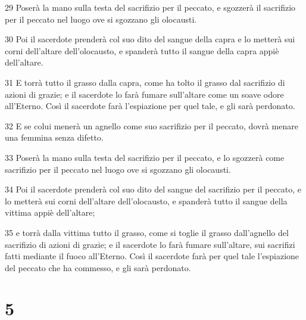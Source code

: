 \par 29 Poserà la mano sulla testa del sacrifizio per il peccato, e sgozzerà il sacrifizio per il peccato nel luogo ove si sgozzano gli olocausti.
\par 30 Poi il sacerdote prenderà col suo dito del sangue della capra e lo metterà sui corni dell'altare dell'olocausto, e spanderà tutto il sangue della capra appiè dell'altare.
\par 31 E torrà tutto il grasso dalla capra, come ha tolto il grasso dal sacrifizio di azioni di grazie; e il sacerdote lo farà fumare sull'altare come un soave odore all'Eterno. Così il sacerdote farà l'espiazione per quel tale, e gli sarà perdonato.
\par 32 E se colui menerà un agnello come suo sacrifizio per il peccato, dovrà menare una femmina senza difetto.
\par 33 Poserà la mano sulla testa del sacrifizio per il peccato, e lo sgozzerà come sacrifizio per il peccato nel luogo ove si sgozzano gli olocausti.
\par 34 Poi il sacerdote prenderà col suo dito del sangue del sacrifizio per il peccato, e lo metterà sui corni dell'altare dell'olocausto, e spanderà tutto il sangue della vittima appiè dell'altare;
\par 35 e torrà dalla vittima tutto il grasso, come si toglie il grasso dall'agnello del sacrifizio di azioni di grazie; e il sacerdote lo farà fumare sull'altare, sui sacrifizi fatti mediante il fuoco all'Eterno. Così il sacerdote farà per quel tale l'espiazione del peccato che ha commesso, e gli sarà perdonato.

\chapter{5}

